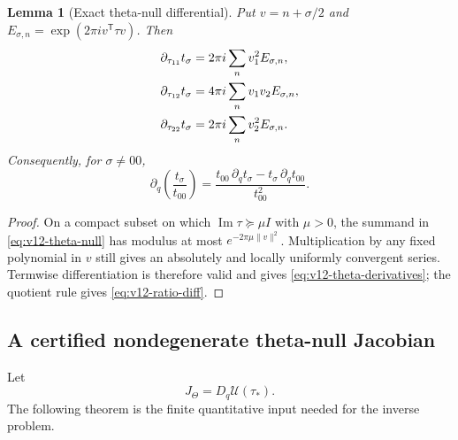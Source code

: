 \documentclass[11pt]{article}
\newtheorem{lemma}[lemma]{Lemma}
\theoremstyle{definition}
\theoremstyle{remark}
\begin{document}
\begin{lemma}[Exact theta-null differential]
\label{lem:v12-theta-diff}
Put \(v=n+\sigma/2\) and
\(E_{\sigma,n}=\exp(2\pi i v^{\mathsf T}\tau v)\).  Then
\begin{align}
 \partial_{\tau_{11}}t_\sigma
 &=2\pi i\sum_n v_1^2 E_{\sigma,n},\notag\\
 \partial_{\tau_{12}}t_\sigma
 &=4\pi i\sum_n v_1v_2 E_{\sigma,n},\notag\\
 \partial_{\tau_{22}}t_\sigma
 &=2\pi i\sum_n v_2^2 E_{\sigma,n}.
 \label{eq:v12-theta-derivatives}
\end{align}
Consequently, for \(\sigma\ne00\),
\begin{equation}
 \boxed{
 \partial_q\!\left(\frac{t_\sigma}{t_{00}}\right)
 =\frac{t_{00}\,\partial_qt_\sigma
       -t_\sigma\,\partial_qt_{00}}{t_{00}^2}.}
 \label{eq:v12-ratio-diff}
\end{equation}
\end{lemma}
\begin{proof}
On a compact subset on which
\(\operatorname{Im}\tau\succeq\mu I\) with \(\mu>0\), the summand in
\cref{eq:v12-theta-null} has modulus at most
\(e^{-2\pi\mu\|v\|^2}\).  Multiplication by any fixed polynomial in \(v\)
still gives an absolutely and locally uniformly convergent series.  Termwise
differentiation is therefore valid and gives
\cref{eq:v12-theta-derivatives}; the quotient rule gives
\cref{eq:v12-ratio-diff}.
\end{proof}

\subsection{A certified nondegenerate theta-null Jacobian}
Let
\[
 J_\Theta=D_q\mathcal U(\tau_*).
\]
The following theorem is the finite quantitative input needed for the inverse
problem.
\end{document}
